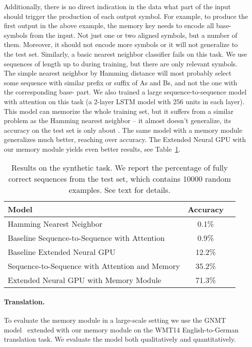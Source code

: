 \documentclass{article} \usepackage{iclr2017_conference,times}
\begin{document}
Additionally, there is no direct indication in the data what part
of the input should trigger the production of each output symbol.
For example, to produce the first  output in the above example,
the memory key needs to encode all base- symbols from the input.
Not just one or two aligned symbols, but a number of them.
Moreover, it should not encode more symbols or it will not generalize
to the test set. Similarly, a basic nearest neighbor classifier
fails on this task. We use sequences of length up to  during
training, but there are only  relevant symbols. The simple
nearest neighbor by Hamming distance will most probably select
some sequence with similar prefix or suffix of As and Bs,
and not the one with the corresponding base- part.
We also trained a large sequence-to-sequence model with attention
on this task (a 2-layer LSTM model with 256 units in each layer).
This model can memorize the whole training set, but it suffers from
a similar problem as the Hamming nearest neighbor -- it almost doesn't
generalize, its accuracy on the test set is only about .
The same model with a memory module generalizes much better,
reaching over  accuracy. The Extended Neural GPU with our memory module yields even better results, see Table~\ref{tab:synthetic}.

\begin{table}\caption{Results on the synthetic task.
  We report the percentage of fully correct sequences
  from the test set, which contains 10000 random examples.
  See text for details.}
\begin{center}
\begin{tabular}{|l||c|c|}
\hline
{\bf Model}                   & Accuracy  \\ \hline
Hamming Nearest Neighbor      & 0.1\%     \\
Baseline Sequence-to-Sequence with Attention & 0.9\% \\
Baseline Extended Neural GPU  & 12.2\%    \\
\hline
Sequence-to-Sequence with Attention and Memory & 35.2\% \\
Extended Neural GPU with Memory Module &  71.3\% \\
\hline
\end{tabular}
\end{center}
\label{tab:synthetic}
\end{table}


\paragraph{Translation.}
To evaluate the memory module in a large-scale setting we use the GNMT model~\citep{gnmt}
extended with our memory module on the WMT14 English-to-German translation task.
We evaluate the model both qualitatively and quantitatively.
\end{document}
